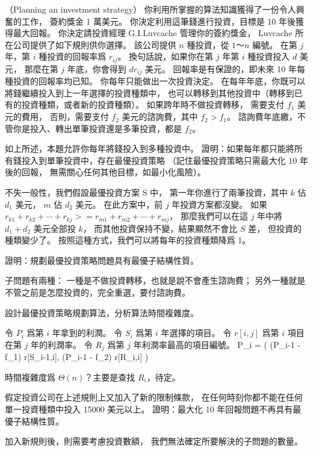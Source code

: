 \startPROBLEM
（Planning an investment strategy）
你利用所掌握的算法知識獲得了一份令人興奮的工作，
簽約獎金 1 萬美元。
你決定利用這筆錢進行投資，目標是 10 年後獲得最大回報。
你決定請投資經理 G.I.Luvcache 管理你的簽約獎金，
 Luvcache 所在公司提供了如下規則供你選擇。
該公司提供 $n$ 種投資，從 $1$～$n$ 編號。
在第 $j$ 年，第 $i$ 種投資的回報率爲 $r_{ij}$。
換句話說，如果你在第 $j$ 年第 $i$ 種投資投入 $d$ 美元，
那麼在第 $j$ 年底，你會得到 $d r_{ij}$ 美元。
回報率是有保證的，即未來 10 年每種投資的回報率均已知。
你每年只能做出一次投資決定。
在每年年底，你既可以將錢繼續投入到上一年選擇的投資種類中，
也可以轉移到其他投資中（轉移到已有的投資種類，或者新的投資種類）。
如果跨年時不做投資轉移，
需要支付 $f_1$ 美元的費用，
否則，需要支付 $f_2$ 美元的諮詢費，其中 $f_2 > f_1$。
諮詢費年底繳，不管你是投入、轉出單筆投資還是多筆投資，都是 $f_2$。

\startigBase[a]\startitem
如上所述，本題允許你每年將錢投入到多種投資中。
證明：如果每年都只能將所有錢投入到單筆投資中，存在最優投資策略
（記住最優投資策略只需最大化 10 年後的回報，
無需關心任何其他目標，如最小化風險）。
\stopitem\stopigBase

\startANSWER
不失一般性，我們假設最優投資方案 S 中，
第一年你進行了兩筆投資，其中 $k$ 佔 $d_1$ 美元，
 $m$ 佔 $d_2$ 美元。
在此方案中，前 $j$ 年投資方案都沒變。
如果 $r_{k1}+r_{k2}+\cdots+r_{kj} >= r_{m1}+r_{m2}+\cdots+r_{mj}$，
那麼我們可以在這 $j$ 年中將 $d_1+d_2$ 美元全部投 $k$，
而其他投資保持不變，結果顯然不會比 $S$ 差，
但投資的種類變少了。
按照這種方式，我們可以將每年的投資種類降爲 1。
\stopANSWER

\startigBase[continue]\startitem
證明：規劃最優投資策略問題具有最優子結構性質。
\stopitem\stopigBase

\startANSWER
子問題有兩種：
一種是不做投資轉移，也就是說不會產生諮詢費；
另外一種就是不管之前是怎麼投資的，完全重選，要付諮詢費。
\stopANSWER

\startigBase[continue]\startitem
設計最優投資策略規劃算法，分析算法時間複雜度。
\stopitem\stopigBase

\startANSWER
令 $P_i$ 爲第 $i$ 年拿到的利潤。
令 $S_i$ 爲第 $i$ 年選擇的項目。
令 $r[i,j]$ 爲第 $i$ 項目在第 $j$ 年的利潤率。
令 $R_j$ 爲第 $j$ 年利潤率最高的項目編號。
\startformula
P_i = \max(
(P_{i-1} - f_1) \times r[S_{i-1},i],
(P_{i-1} - f_2) \times r[R_i,i]
)
\stopformula

時間複雜度爲 $\Theta(n)$？主要是查找 $R_i$，待定。
\stopANSWER

\startigBase[continue]\startitem
假定投資公司在上述規則上又加入了新的限制條款，
在任何時刻你都不能在任何單一投資種類中投入 15000 美元以上。
證明：最大化 10 年回報問題不再具有最優子結構性質。
\stopitem\stopigBase

\startANSWER
加入新規則後，則需要考慮投資數額，
我們無法確定所要解決的子問題的數量。
\stopANSWER

\stopPROBLEM

